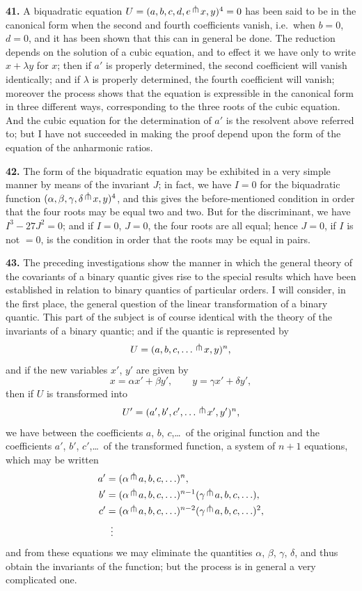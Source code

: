 \documentclass[11pt,a4paper]{book}
\begin{document}
\textbf{41.} A biquadratic equation $U=(a,b,c,d,e\,\raisebox{0.5ex}{$\pitchfork$}\, x,y)^{4}=0$ has been said to be in the canonical form when the second and fourth coefficients vanish, i.e.\ when $b=0$, $d=0$, and it has been shown that this can in general be done. The reduction depends on the solution of a cubic equation, and to effect it we have only to write $x+\lambda y$ for $x$; then if $a'$ is properly determined, the second coefficient will vanish identically; and if $\lambda$ is properly determined, the fourth coefficient will vanish; moreover the process shows that the equation is expressible in the canonical form in three different ways, corresponding to the three roots of the cubic equation. And the cubic equation for the determination of $a'$ is the resolvent above referred to; but I have not succeeded in making the proof depend upon the form of the equation of the anharmonic ratios.

\textbf{42.} The form of the biquadratic equation may be exhibited in a very simple manner by means of the invariant $J$; in fact, we have $I=0$ for the biquadratic function $(\alpha,\beta,\gamma,\delta\,\raisebox{0.5ex}{$\pitchfork$}\, x, y)^{4}$, and this gives the before-mentioned condition in order that the four roots may be equal two and two. But for the discriminant, we have $I^{3}-27J^{2}=0$; and if $I=0$, $J=0$, the four roots are all equal; hence $J=0$, if $I$ is not $=0$, is the condition in order that the roots may be equal in pairs.

\clearpage
\setcounter{page}{266}

\textbf{43.} The preceding investigations show the manner in which the general theory of the covariants of a binary quantic gives rise to the special results which have been established in relation to binary quantics of particular orders. I will consider, in the first place, the general question of the linear transformation of a binary quantic. This part of the subject is of course identical with the theory of the invariants of a binary quantic; and if the quantic is represented by
\[
U=(a,b,c,\ldots\,\raisebox{0.5ex}{$\pitchfork$}\, x,y)^{n},
\]
and if the new variables $x'$, $y'$ are given by
\[
x=\alpha x'+\beta y',\qquad y=\gamma x'+\delta y',
\]
then if $U$ is transformed into
\[
U'=(a',b',c',\ldots\,\raisebox{0.5ex}{$\pitchfork$}\, x',y')^{n},
\]
we have between the coefficients $a$, $b$, $c$,\ldots\ of the original function and the coefficients $a'$, $b'$, $c'$,\ldots\ of the transformed function, a system of $n+1$ equations, which may be written
\begin{align*}
a' &= (\alpha\,\raisebox{0.5ex}{$\pitchfork$}\, a,b,c,\ldots)^{n},\\
b' &= (\alpha\,\raisebox{0.5ex}{$\pitchfork$}\, a,b,c,\ldots)^{n-1}(\gamma\,\raisebox{0.5ex}{$\pitchfork$}\, a,b,c,\ldots),\\
c' &= (\alpha\,\raisebox{0.5ex}{$\pitchfork$}\, a,b,c,\ldots)^{n-2}(\gamma\,\raisebox{0.5ex}{$\pitchfork$}\, a,b,c,\ldots)^{2},\\
&\ \,\vdots
\end{align*}
and from these equations we may eliminate the quantities $\alpha$, $\beta$, $\gamma$, $\delta$, and thus obtain the invariants of the function; but the process is in general a very complicated one.
\end{document}

